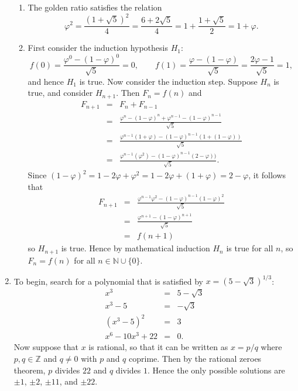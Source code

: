 \documentclass[12pt]{article}
\newcommand{\N}{\mathbb{N}}
\newcommand{\Z}{\mathbb{Z}}
\begin{document}
\begin{enumerate}
    \begin{enumerate}
      \item The golden ratio satisfies the relation 
	\[
	\varphi^2 = \frac{(1+\sqrt{5})^2}{4} = \frac{6+2\sqrt{5}}{4} = 1 + \frac{1+\sqrt{5}}{2} = 1 + \varphi.
	\]
      \item First consider the induction hypothesis $H_1$:
	\[
	f(0)= \frac{\varphi^0 - (1-\varphi)^0}{\sqrt{5}} = 0, \qquad f(1) = \frac{\varphi- (1-\varphi)}{\sqrt{5}} = \frac{2\varphi-1}{\sqrt{5}} = 1,
	\]
	and hence $H_1$ is true. Now consider the induction step. Suppose $H_n$
	is true, and consider $H_{n+1}$. Then $F_n=f(n)$ and
	\begin{eqnarray*}
	  F_{n+1} &=& F_n+F_{n-1} \\
	  &=& \frac{\varphi^n - (1-\varphi)^n + \varphi^{n-1} - (1-\varphi)^{n-1}}{\sqrt{5}} \\
	  &=& \frac{\varphi^{n-1}(1+\varphi) - (1-\varphi)^{n-1} ( 1+ (1-\varphi))}{\sqrt{5}} \\
	  &=& \frac{\varphi^{n-1}(\varphi^2) - (1-\varphi)^{n-1} ( 2-\varphi))}{\sqrt{5}}.
	\end{eqnarray*}
	Since $(1-\varphi)^2 = 1-2\varphi+\varphi^2 = 1-2\varphi+(1+\varphi) = 2-\varphi$, it follows
	that
	\begin{eqnarray*}
	  F_{n+1} &=&  \frac{\varphi^{n-1}\varphi^2 - (1-\varphi)^{n-1}(1-\varphi)^2}{\sqrt{5}} \\
	  &=& \frac{\varphi^{n+1} - (1-\varphi)^{n+1}}{\sqrt{5}} \\
	  &=& f(n+1)
	\end{eqnarray*}
	so $H_{n+1}$ is true. Hence by mathematical induction $H_n$ is true for
	all $n$, so $F_n=f(n)$ for all $n \in \N \cup \{0\}$.
    \end{enumerate}
  \item To begin, search for a polynomial that is satisfied by
    $x=(5-\sqrt{3})^{1/3}$:
    \begin{eqnarray*}
      x^3 &=& 5-\sqrt{3} \\
      x^3 - 5 &=& -\sqrt{3} \\
      (x^3-5)^2 &=& 3 \\
      x^6 - 10x^3 + 22 &=& 0.
    \end{eqnarray*}
    Now suppose that $x$ is rational, so that it can be written as $x=p/q$
    where $p,q \in \Z$ and $q \ne 0$ with $p$ and $q$ coprime. Then by the
    rational zeroes theorem, $p$ divides $22$ and $q$ divides $1$. Hence the
    only possible solutions are $\pm 1$, $\pm 2$, $\pm 11$, and $\pm 22$.

\end{enumerate}
\end{document}
